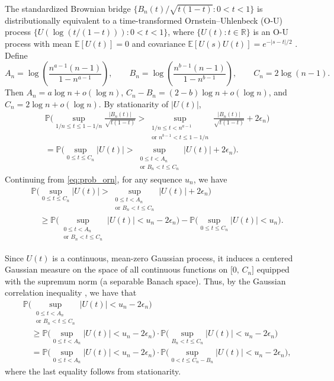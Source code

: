 \documentclass[10pt]{article}
\theoremstyle{definition}
\theoremstyle{remark}
\begin{document}
The standardized Brownian bridge $ \big\{ B_n(t)/\sqrt{t(1-t)} : 0 < t < 1 \big\} $ is distributionally equivalent to a time-transformed Ornstein--Uhlenbeck (O-U) process $ \big\{ U(\log(t/(1-t))) : 0 < t < 1\big\} $, where $ \big\{U(t): t \in \mathbb{R}\big\}$ is an O-U process with mean $ \mathbb{E}[U(t)] =0 $ and covariance $\mathbb{E}[U(s)U(t)] = e^{-|s-t|/2}$ \citep[Section 1.9]{csorgo1981strong}. Define
\[
    A_n=\log\!\left(\frac{n^{a-1}(n-1)}{1-n^{a-1}}\right),\qquad
    B_n=\log\!\left(\frac{n^{b-1}(n-1)}{1-n^{b-1}}\right),\qquad
    C_n=2\log(n-1).
\]
Then $A_n=a\log n+o(\log n)$, $C_n-B_n=(2-b)\log n+o(\log n)$, and $C_n=2\log n+o(\log n)$. By stationarity of $|U(t)|$,
\begin{align}\label{eq:prob_orn}
    \nonumber & \mathbb{P}\bigg( \sup_{ 1/n \leq t \leq 1-1/n} \frac{|B_n(t)|}{\sqrt{t(1-t)}} > \sup_{\substack{1/n \leq t < n^{a-1}\\ \text{or } n^{b-1} < t \leq 1-1/n}} \frac{|B_n(t)|}{\sqrt{t(1-t)}} + 2\epsilon_n\bigg) \\
    & =  \mathbb{P}\bigg( \sup_{0 \leq t \leq C_n} |U(t)| > \sup_{\substack{0 \leq t < A_n\\ \text{or } B_n < t \leq C_n}} |U(t)| + 2\epsilon_n \bigg).
\end{align}
Continuing from \eqref{eq:prob_orn}, for any sequence $u_n$, we have
\begin{equation} 
\begin{aligned} \label{eq:prob_lower}
& \mathbb{P}\bigg( \sup_{0 \leq t \leq C_n} |U(t)| > \sup_{\substack{0 \leq t < A_n\\ \text{or } B_n < t \leq C_n}} |U(t)| + 2\epsilon_n \bigg) \\
& \quad \geq
\mathbb{P}\bigg(\sup_{\substack{0 \leq t < A_n\\ \text{or } B_n < t \leq C_n}} |U(t)| < u_n - 2\epsilon_n \bigg)
- \mathbb{P}\bigg( \sup_{0 \leq t \leq C_n} |U(t)| < u_n \bigg).
\end{aligned}
\end{equation}

Since $ U(t) $ is a continuous, mean-zero Gaussian process, it induces a centered Gaussian measure on the space of all continuous functions on $\big[0,\,C_n\big] $ equipped with the supremum norm (a separable Banach space). Thus, by the Gaussian correlation inequality \citep[Remark 3 (i)]{latala2017royen}, we have that
\begin{align} \label{eq:prob_lower_prod}
    \nonumber & \mathbb{P}\bigg(\sup_{\substack{0 \leq t < A_n\\ \text{or } B_n < t \leq C_n}} |U(t)| < u_n - 2\epsilon_n \bigg) \\
    \nonumber &\quad \geq
    \mathbb{P}\bigg(\sup_{0 \leq t < A_n} |U(t)| < u_n - 2\epsilon_n \bigg)\cdot\mathbb{P}\bigg(\sup_{B_n < t \leq C_n} |U(t)| < u_n - 2\epsilon_n \bigg) \\
    & \quad =
    \mathbb{P}\bigg(\sup_{0 \leq t < A_n} |U(t)| < u_n - 2\epsilon_n \bigg)\cdot\mathbb{P}\bigg(\sup_{0 < t \leq C_n-B_n} |U(t)| < u_n - 2\epsilon_n \bigg),
\end{align}
where the last equality follows from stationarity.
\end{document}
